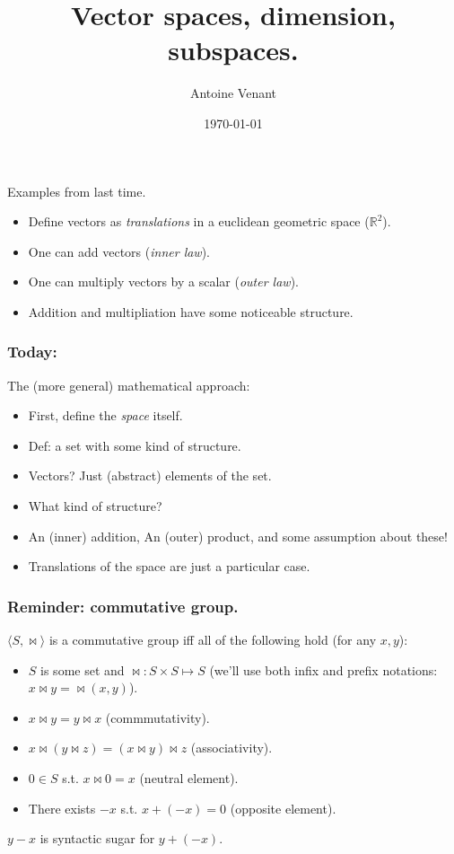 \documentclass{beamer}
\begin{document}
\title{Vector spaces, dimension, subspaces.} 
\author{Antoine Venant}
\date{\today}
\maketitle


\begin{frame}{Examples from last time.}
  
  \begin{itemize}
  \item Define vectors as \emph{translations} in a euclidean geometric space ($\mathbb{R}^2$).
  \item One can add vectors (\emph{inner law}).
  \item One can multiply vectors by a scalar (\emph{outer law}).
  \item Addition and multipliation have some noticeable structure.
  \end{itemize}
\end{frame}

\begin{frame}
  \frametitle{Today:}
  The (more general) mathematical approach:
  \begin{itemize}
  \item First, define the \emph{space} itself.
  \item Def: a set with some kind of structure.
  \item Vectors? Just (abstract) elements of the set.
  \item What kind of structure?
  \item An (inner) addition, An (outer) product, and some assumption about these!
  \item Translations of the space are just a particular case.
  \end{itemize}  
\end{frame}

\begin{frame}
  \frametitle{Reminder: commutative group.}

  $\langle S, \bowtie \rangle$ is a commutative group iff all of the following hold (for any $x, y$):
  \begin{itemize}
  \item $S$ is some set and $\bowtie: S \times S \mapsto S$ (we'll use both infix and prefix notations: $x \bowtie y = \bowtie(x, y)$).
  \item $x \bowtie y = y \bowtie x$ (commmutativity).
  \item $x \bowtie (y \bowtie z) = (x \bowtie y) \bowtie z$ (associativity).
  \item $0 \in S$ s.t. $x \bowtie 0 = x$ (neutral element).
  \item There exists $-x$ s.t. $x + (-x) = 0$ (opposite element).
  \end{itemize}

  \begin{center}
    $y - x$ is syntactic sugar for $y + (-x)$.
  \end{center}
\end{frame}
\end{document}

